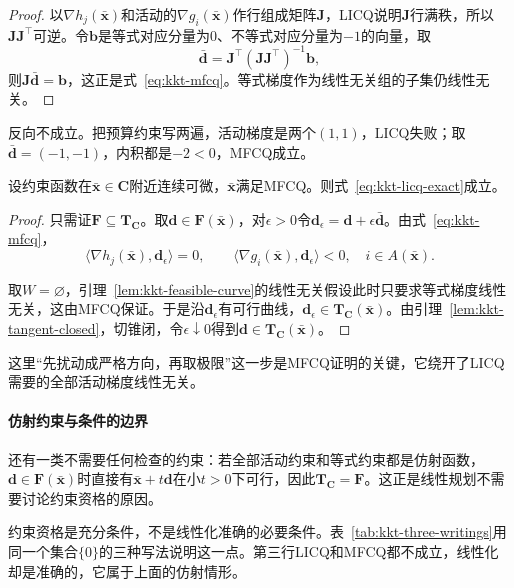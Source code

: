 \begin{proof}
以$\nabla h_j(\bar{\bm{x}})$和活动的$\nabla g_i(\bar{\bm{x}})$作行组成矩阵$\bm{J}$，LICQ说明$\bm{J}$行满秩，所以$\bm{J}\bm{J}^\top$可逆。令$\bm{b}$是等式对应分量为$0$、不等式对应分量为$-1$的向量，取
\[
 \bar{\bm{d}}=\bm{J}^\top(\bm{J}\bm{J}^\top)^{-1}\bm{b},
\]
则$\bm{J}\bar{\bm{d}}=\bm{b}$，这正是式~\eqref{eq:kkt-mfcq}。等式梯度作为线性无关组的子集仍线性无关。
\end{proof}

反向不成立。把预算约束写两遍，活动梯度是两个$(1,1)$，LICQ失败；取$\bar{\bm{d}}=(-1,-1)$，内积都是$-2<0$，MFCQ成立。

\begin{theorem}[MFCQ下线性化准确]
\label{thm:kkt-mfcq-exact}
设约束函数在$\bar{\bm{x}}\in\bm{C}$附近连续可微，$\bar{\bm{x}}$满足MFCQ。则式~\eqref{eq:kkt-licq-exact}成立。
\end{theorem}

\begin{proof}
只需证$\bm{F}\subseteq\bm{T}_{\bm{C}}$。取$\bm{d}\in\bm{F}(\bar{\bm{x}})$，对$\epsilon>0$令$\bm{d}_\epsilon=\bm{d}+\epsilon\bar{\bm{d}}$。由式~\eqref{eq:kkt-mfcq}，
\[
 \langle\nabla h_j(\bar{\bm{x}}),\bm{d}_\epsilon\rangle=0,\qquad
 \langle\nabla g_i(\bar{\bm{x}}),\bm{d}_\epsilon\rangle<0,\quad i\in A(\bar{\bm{x}}).
\]

取$W=\varnothing$，引理~\ref{lem:kkt-feasible-curve}的线性无关假设此时只要求等式梯度线性无关，这由MFCQ保证。于是沿$\bm{d}_\epsilon$有可行曲线，$\bm{d}_\epsilon\in\bm{T}_{\bm{C}}(\bar{\bm{x}})$。由引理~\ref{lem:kkt-tangent-closed}，切锥闭，令$\epsilon\downarrow0$得到$\bm{d}\in\bm{T}_{\bm{C}}(\bar{\bm{x}})$。
\end{proof}

这里“先扰动成严格方向，再取极限”这一步是MFCQ证明的关键，它绕开了LICQ需要的全部活动梯度线性无关。

\paragraph{仿射约束与条件的边界}
还有一类不需要任何检查的约束：若全部活动约束和等式约束都是仿射函数，$\bm{d}\in\bm{F}(\bar{\bm{x}})$时直接有$\bar{\bm{x}}+t\bm{d}$在小$t>0$下可行，因此$\bm{T}_{\bm{C}}=\bm{F}$。这正是线性规划不需要讨论约束资格的原因。

约束资格是充分条件，不是线性化准确的必要条件。表~\ref{tab:kkt-three-writings}用同一个集合$\{0\}$的三种写法说明这一点。第三行LICQ和MFCQ都不成立，线性化却是准确的，它属于上面的仿射情形。

